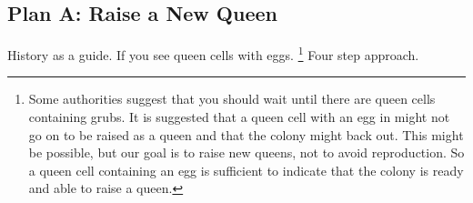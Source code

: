 \subsection{Plan A: Raise a New Queen}

History as a guide.
If you see queen cells with eggs.
\footnote{Some authorities suggest that you should wait until 
there are queen cells containing grubs.
It is suggested that a queen cell with an egg in might not 
go on to be raised as a queen and that the colony might back out.
This might be possible, but our goal is to raise new queens,
not to avoid reproduction.
So a queen cell containing an egg is sufficient to indicate
that the colony is ready and able to raise a queen.}
Four step approach.



\setcounter{rowno}{0}


